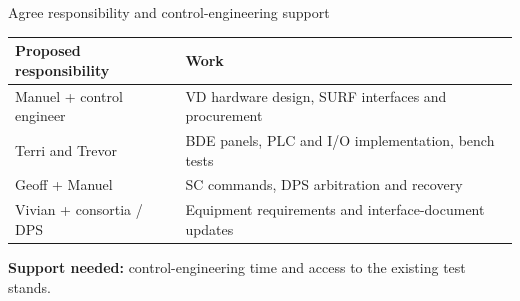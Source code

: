 \documentclass[aspectratio=169,11pt]{beamer}
\begin{document}
\begin{frame}{Agree responsibility and control-engineering support}
\renewcommand{\arraystretch}{1.45}
\begin{tabularx}{\textwidth}{@{}>{\RaggedRight\arraybackslash}p{4.1cm}>{\RaggedRight\arraybackslash}X@{}}
\toprule
\textbf{Proposed responsibility} & \textbf{Work}\\\midrule
Manuel + control engineer & VD hardware design, SURF interfaces and procurement\\
Terri and Trevor & BDE panels, PLC and I/O implementation, bench tests\\
Geoff + Manuel & SC commands, DPS arbitration and recovery\\
Vivian + consortia / DPS & Equipment requirements and interface-document updates\\
\bottomrule
\end{tabularx}\par\bigskip
\textbf{Support needed:} control-engineering time and access to the existing test stands.
\end{frame}

\appendix

\end{document}
